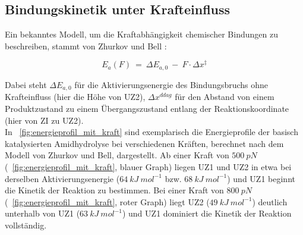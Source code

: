 \subsection{Bindungskinetik unter Krafteinfluss}
\label{subsec:bindungskinetik_unter_krafteinfluss}

Ein bekanntes Modell, um die Kraftabhängigkeit chemischer Bindungen zu beschreiben, stammt von Zhurkov und Bell \cite{Zhurkov.1984,Bell.1978}:

\begin{equation}
	E_a(F)~=~\Delta E_{a,0}~-~F \cdot \Delta x^\ddag
	\label{eq:bell_modell}
\end{equation}

Dabei steht $\Delta E_{a,0}$ für die Aktivierungsenergie des Bindungsbruchs ohne Krafteinfluss (hier die Höhe von \ac{UZ}2), $\Delta x^{ddag}$ für den Abstand von einem Produktzustand zu einem Übergangszustand entlang der Reaktionskoordinate (hier von \ac{ZI} zu \ac{UZ}2).\\

In \abb~\ref{fig:energieprofil_mit_kraft} sind exemplarisch die Energieprofile der basisch katalysierten Amidhydrolyse bei verschiedenen Kräften, berechnet nach dem Modell von Zhurkov und Bell, dargestellt. Ab einer Kraft von $500~pN$ (\abb~\ref{fig:energieprofil_mit_kraft}, blauer Graph) liegen \ac{UZ}1 und \ac{UZ}2 in etwa bei derselben Aktivierungsenergie ($64~kJ~mol^{-1}$ bzw. $68~kJ~mol^{-1}$) und \ac{UZ}1 beginnt die Kinetik der Reaktion zu bestimmen. Bei einer Kraft von $800~pN$ (\abb~\ref{fig:energieprofil_mit_kraft}, roter Graph) liegt \ac{UZ}2 ($49~kJ~mol^{-1}$) deutlich unterhalb von \ac{UZ}1 ($63~kJ~mol^{-1}$) und \ac{UZ}1 dominiert die Kinetik der Reaktion vollständig.\\

